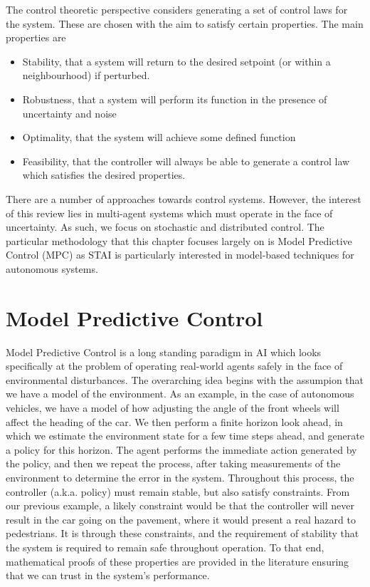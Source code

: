 \documentclass[../sample.tex]{subfiles}
\begin{document}
The control theoretic perspective considers generating a set of control laws for the system. These
are chosen with the aim to satisfy certain properties. The main properties are

\begin{itemize}
	\item Stability, that a system will return to the desired setpoint (or within a neighbourhood) if
	perturbed.

	\item Robustness, that a system will perform its function in the presence of uncertainty and
	noise

	\item Optimality, that the system will achieve some defined function 

	\item Feasibility, that the controller will always be able to generate a control law which
	satisfies the desired properties.
\end{itemize}


There are a number of approaches towards control systems. However, the interest of this review lies
in multi-agent systems which must operate in the face of uncertainty. As such, we focus on
stochastic and distributed control. The particular methodology that this chapter focuses largely on
is Model Predictive Control (MPC) as STAI is particularly interested in model-based techniques for
autonomous systems.

\section{Model Predictive Control}

Model Predictive Control is a long standing paradigm in AI which looks specifically at the problem
of operating real-world agents safely in the face of environmental disturbances. The overarching
idea begins with the assumpion that we have a model of the environment. As an example, in
the case of autonomous vehicles, we have a model of how adjusting the angle of the front wheels will
affect the heading of the car. We then perform a finite horizon look ahead, in which we estimate the
environment state for a few time steps ahead, and generate a policy for this horizon. The agent
performs the immediate action generated by the policy, and then we repeat the process, after taking
measurements of the environment to determine the error in the system. Throughout this process, the
controller (a.k.a. policy) must remain stable, but also satisfy constraints. From our previous
example, a likely constraint would be that the controller will never result in the car going on the
pavement, where it would present a real hazard to pedestrians. It is through these constraints, and
the requirement of stability that the system is required to remain safe throughout operation. To
that end, mathematical proofs of these properties are provided in the literature ensuring that we
can trust in the system's performance.
\end{document}
